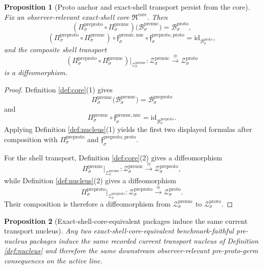 \documentclass[11pt]{article}
\newcommand{\ProtoBody}[1]{\mathcal B_{#1}^{\mathrm{proto}}}
\newcommand{\ProtoShellSet}[1]{\mathcal Z_{#1}^{\mathrm{proto}}}
\newcommand{\PreProtoBody}[1]{\mathcal B_{#1}^{\mathrm{preproto}}}
\newcommand{\PreProtoProj}[1]{\Pi_{#1}^{\mathrm{preproto}}}
\newcommand{\PreProtoProtoMin}[1]{\mathfrak f_{#1}^{\mathrm{preproto,proto}}}
\newcommand{\PreProtoShellSet}[1]{\mathcal Z_{#1}^{\mathrm{preproto}}}
\newcommand{\PreNucCore}{\mathfrak R^{\mathrm{core}}}
\newcommand{\PreNucBody}[1]{\mathcal B_{#1}^{\mathrm{prenuc}}}
\newcommand{\PreNucProj}[1]{\Pi_{#1}^{\mathrm{prenuc}}}
\newcommand{\PreNucNucleusMin}[1]{\mathfrak f_{#1}^{\mathrm{prenuc,nuc}}}
\newcommand{\PreNucShellSet}[1]{\mathcal Z_{#1}^{\mathrm{prenuc}}}
\newtheorem{proposition}{Proposition}
\begin{document}
\begin{proposition}[Proto anchor and exact-shell transport persist from the core]
\label{prop:anchor}
Fix an observer-relevant exact-shell core \(\PreNucCore\). Then
\[
(\PreProtoProj{\sigma}\circ\PreNucProj{\sigma})\bigl(\PreNucBody{\sigma}\bigr)
=
\ProtoBody{\sigma},
\]
\[
(\PreProtoProj{\sigma}\circ\PreNucProj{\sigma})\circ
\PreNucNucleusMin{\sigma}\circ\PreProtoProtoMin{\sigma}
=
\mathrm{id}_{\ProtoBody{\sigma}},
\]
and the composite shell transport
\[
(\PreProtoProj{\sigma}\circ\PreNucProj{\sigma})\big|_{\PreNucShellSet{\sigma}}
:
\PreNucShellSet{\sigma}
\xrightarrow{\cong}
\ProtoShellSet{\sigma}
\]
is a diffeomorphism.
\end{proposition}

\begin{proof}
Definition \ref{def:core}(1) gives
\[
\PreNucProj{\sigma}\bigl(\PreNucBody{\sigma}\bigr)=\PreProtoBody{\sigma}
\]
and
\[
\PreNucProj{\sigma}\circ\PreNucNucleusMin{\sigma}
=
\mathrm{id}_{\PreProtoBody{\sigma}}.
\]
Applying Definition \ref{def:nucleus}(1) yields the first two displayed formulas after composition with \(\PreProtoProj{\sigma}\) and \(\PreProtoProtoMin{\sigma}\).

For the shell transport, Definition \ref{def:core}(2) gives a diffeomorphism
\[
\PreNucProj{\sigma}\big|_{\PreNucShellSet{\sigma}}
:
\PreNucShellSet{\sigma}
\xrightarrow{\cong}
\PreProtoShellSet{\sigma},
\]
while Definition \ref{def:nucleus}(2) gives a diffeomorphism
\[
\PreProtoProj{\sigma}\big|_{\PreProtoShellSet{\sigma}}
:
\PreProtoShellSet{\sigma}
\xrightarrow{\cong}
\ProtoShellSet{\sigma}.
\]
Their composition is therefore a diffeomorphism from \(\PreNucShellSet{\sigma}\) to \(\ProtoShellSet{\sigma}\).
\end{proof}

\begin{proposition}[Exact-shell-core-equivalent packages induce the same current transport nucleus]
\label{prop:eq}
Any two exact-shell-core-equivalent benchmark-faithful pre-nucleus packages induce the same recorded current transport nucleus of Definition \ref{def:nucleus} and therefore the same downstream observer-relevant pre-proto-germ consequences on the active line.
\end{proposition}
\end{document}
